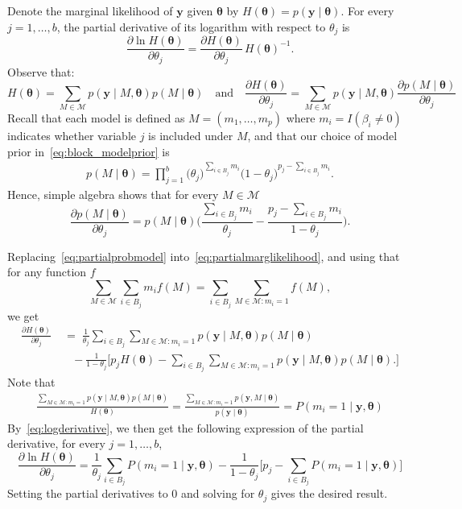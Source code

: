 \documentclass[
  12pt]{article}
\newcommand{\M}{\mathcal{M}}
\newcommand{\by}{\mathbf{y}}
\newcommand{\btheta}{\boldsymbol{\theta}}
\begin{document}
Denote the marginal likelihood of $\by$ given $\btheta$ by $H(\btheta)=p(\by \mid \btheta)$. For every $j=1,\ldots,b$, the partial derivative of its logarithm with respect to $\theta_j$ is
    \begin{equation}\label{eq:logderivative}
        \frac{\partial \ln H(\btheta)}{\partial \theta_j}=\frac{\partial H(\btheta)}{\partial \theta_j}\,H(\btheta)^{-1}.
    \end{equation}
    Observe that:
    \begin{equation}\label{eq:partialmarglikelihood}
    H(\btheta)=\sum_{M \in \M}p(\by \mid M,\btheta)p(M \mid \btheta)
    \quad \text{and}\quad 
    \frac{\partial H(\btheta)}{\partial \theta_j}=\sum_{M\in \M}p(\by \mid M,\btheta)\frac{\partial p(M \mid \btheta)}{\partial \theta_j}
    \end{equation}
    Recall that each model is defined as $M=(m_1,\ldots,m_p)$ where $m_i = I(\beta_i \neq 0)$ indicates whether variable $j$ is included under $M$, and that our choice of model prior in~\eqref{eq:block_modelprior} is 
    \begin{align}
        p( M \mid \btheta)=
        \prod_{j=1}^b \big(\theta_j\big)^{\sum_{i \in B_j} m_i}
        \big(1 - \theta_j\big)^{p_j - \sum_{i \in B_j} m_i}.
        \nonumber
    \end{align}
    Hence, simple algebra shows that for every $M\in \mathcal M$
    \begin{equation}\label{eq:partialprobmodel}
    \frac{\partial p(M \mid \btheta)}{\partial \theta_j}= p(M \mid \btheta) \bigg(\frac{\sum_{i\in B_j}m_i}{\theta_j}-\frac{p_j-\sum_{i\in B_j}m_i}{1-\theta_j} \bigg).       
    \end{equation}
    
    Replacing~\eqref{eq:partialprobmodel} into~\eqref{eq:partialmarglikelihood}, and using that for any function $f$ $$\sum_{M\in \M}\sum_{i\in B_j}m_if(M)=\sum_{i\in B_j}\sum_{M\in \M:m_i=1}f(M),$$ we get
    \begin{align}\label{eq:partialmarglikelihood2}
        \frac{\partial H(\btheta)}{\partial \theta_j}&\;=\;\frac{1}{\theta_j}\sum_{i \in B_j}\sum_{M\in \M: m_i=1}p(\by \mid M,\btheta)p(M \mid \btheta) \\&\quad- \frac{1}{1-\theta_j}\bigg[p_j H(\btheta)-\sum_{i \in B_j}\sum_{M\in \M: m_i=1}p(\by \mid M,\btheta)p(M \mid \btheta). \nonumber
        \bigg]
    \end{align}
    Note that
    \begin{align*}
        \frac{\sum_{M\in \M: m_i=1}p(\by \mid M,\btheta)p(M \mid \btheta)}{H(\btheta)} = \frac{\sum_{M\in \M: m_i=1}p(\by , M\mid \btheta)}{p(\by \mid \btheta)}= P(m_i = 1\mid \by,\btheta)
    \end{align*}
    By~\eqref{eq:logderivative}, we then get the following expression of the partial derivative, for every $j=1,\ldots,b$,
    $$\frac{\partial \ln H(\btheta)}{\partial \theta_j}=\frac{1}{\theta_j}\sum_{i \in B_j}P(m_i = 1\mid \by,\btheta) - \frac{1}{1-\theta_j}\bigg[p_j-\sum_{i \in B_j}P(m_i = 1\mid \by,\btheta)
        \bigg]$$
    Setting the partial derivatives to 0 and solving for $\theta_j$ gives the desired result.
\end{document}
